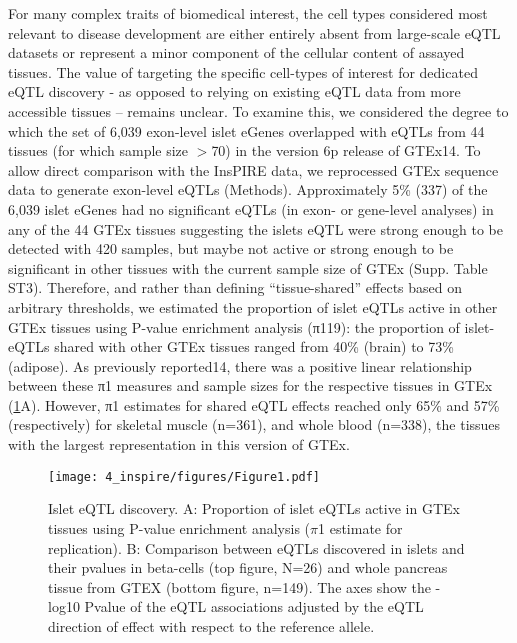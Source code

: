 For many complex traits of biomedical interest, the cell types considered most relevant to disease development are either entirely absent from large-scale eQTL datasets or represent a minor component of the cellular content of assayed tissues. The value of targeting the specific cell-types of interest for dedicated eQTL discovery - as opposed to relying on existing eQTL data from more accessible tissues – remains unclear. To examine this, we considered the degree to which the set of 6,039 exon-level islet eGenes overlapped with eQTLs from 44 tissues (for which sample size $>$70) in the version 6p release of GTEx14. To allow direct comparison with the InsPIRE data, we reprocessed GTEx sequence data to generate exon-level eQTLs (Methods). Approximately 5\% (337) of the 6,039 islet eGenes had no significant eQTLs (in exon- or gene-level analyses) in any of the 44 GTEx tissues suggesting the islets eQTL were strong enough to be detected with 420 samples, but maybe not active or strong enough to be significant in other tissues with the current sample size of GTEx (Supp. Table ST3). Therefore, and rather than defining “tissue-shared” effects based on arbitrary thresholds, we estimated the proportion of islet eQTLs active in other GTEx tissues using P-value enrichment analysis (π119): the proportion of islet-eQTLs shared with other GTEx tissues ranged from 40\% (brain) to 73\% (adipose). As previously reported14, there was a positive linear relationship between these π1 measures and sample sizes for the respective tissues in GTEx (\ref{fig:c4_f1}A). However, π1 estimates for shared eQTL effects reached only 65\% and 57\% (respectively) for skeletal muscle (n=361), and whole blood (n=338), the tissues with the largest representation in this version of GTEx. \\

\begin{figure}
    \centering
    \texttt{[image: 4\_inspire/figures/Figure1.pdf]}
    \caption{Islet eQTL discovery. A: Proportion of islet eQTLs active in GTEx tissues using P-value enrichment analysis ($\pi$1 estimate for replication). B: Comparison between eQTLs discovered in islets and their pvalues in beta-cells (top figure, N=26) and whole pancreas tissue from GTEX (bottom figure, n=149). The axes show the -log10 Pvalue of the eQTL associations adjusted by the eQTL direction of effect with respect to the reference allele.}
    \label{fig:c4_f1}
\end{figure}

